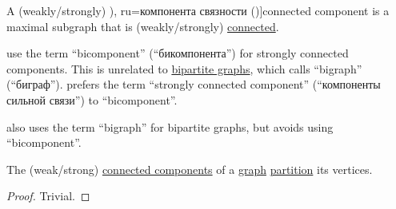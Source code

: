 \begin{definition}\label{def:graph_connected_component}
  A (weakly/strongly) \term[bg=компонента (\cite[15]{Мирчев2001}), ru=компонента связности (\cite[286]{БелоусовТкачёв2004})]{connected component} is a maximal subgraph that is (weakly/strongly) \hyperref[def:graph_connectedness]{connected}.
\end{definition}
\begin{comments}
  \item {} use the term \enquote{bicomponent} (\enquote{бикомпонента}) for strongly connected components. This is unrelated to \hyperref[def:multipartite_graph]{bipartite graphs}, which  calls \enquote{bigraph} (\enquote{биграф}).  prefers the term \enquote{strongly connected component} (\enquote{компоненты сильной связи}) to \enquote{bicomponent}.

   also uses the term \enquote{bigraph} for bipartite graphs, but avoids using \enquote{bicomponent}.
\end{comments}

\begin{proposition}\label{thm:connected_components_partition_graph}
  The (weak/strong) \hyperref[def:graph_connected_component]{connected components} of a \hyperref[rem:arbitrary_kind_graph]{graph} \hyperref[def:set_partition]{partition} its vertices.
\end{proposition}
\begin{proof}
  Trivial.
\end{proof}

